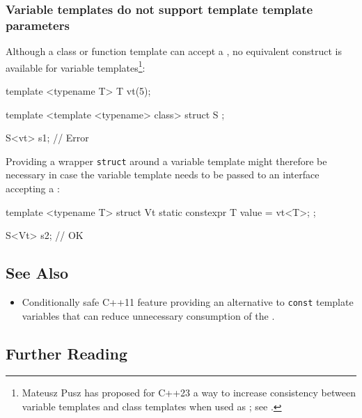 \subsubsection[Variable templates do not support template template parameters]{Variable templates do not support template template parameters}\label{variable-templates-do-not-support-template-template-parameters}

Although a class or function template can accept a
, no equivalent
construct is available for variable templates{\cprotect\footnote{Mateusz Pusz has proposed for C++23 a way to increase consistency between
variable templates and class templates when used as ; see \cite{pusz20}.}}:

\begin{emcppslisting}[emcppsbatch=e7]
template <typename T> T vt(5);

template <template <typename> class>
struct S { };

S<vt> s1;  // Error
\end{emcppslisting}
    
\noindent Providing a wrapper \lstinline!struct!
around a variable template might therefore be necessary in case the variable template needs to be passed to an interface
accepting a :

\begin{emcppslisting}[emcppsbatch=e7]
template <typename T>
struct Vt { static constexpr T value = vt<T>; };

S<Vt> s2;  // OK
\end{emcppslisting}
    

\subsection[See Also]{See Also}\label{see-also}

\begin{itemize}
\item{%
Conditionally safe C++11 feature providing an alternative to \lstinline!const! template variables that can reduce unnecessary consumption of the .}
\end{itemize}

\subsection[Further Reading]{Further Reading}\label{further-reading}

\hspace*{\fill}


